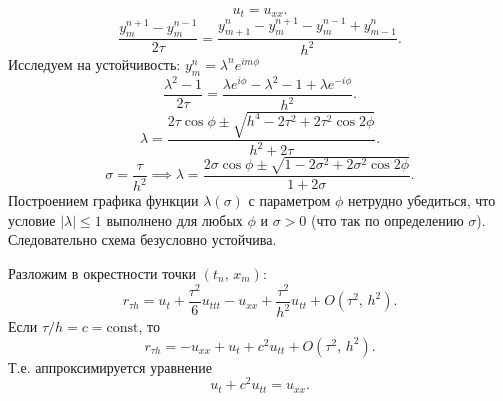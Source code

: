 \documentclass[a4paper]{article}
\begin{document}
\begin{hiProb}[9.8]
\end{hiProb}
\begin{sol}
\[
u_t=u_{x x}
.\] 
\[
	\frac{y_m^{n+1}-y_m^{n-1}}{2\tau}=
	\frac{y_{m+1}^n-y_m^{n+1}-y_m^{n-1}+y
	_{m-1}^n}{h^2}
.\] 
Исследуем на устойчивость: $y_{m}^n=\lambda^n e^{i m \phi}$
\[
\frac{\lambda^2-1}{2\tau}= \frac{\lambda e^{i\phi} -\lambda^2-
1+\lambda e^{-i\phi}}{h^2}
.\] 
\[
\lambda= \frac{2\tau \cos \phi \pm  \sqrt{ h^4 -2 \tau^2+2\tau^2
\cos 2\phi} }{h^2+2 \tau}
.\] 
\[
\sigma= \frac{\tau}{h^2}\implies
\lambda= \frac{2\sigma \cos \phi\pm \sqrt{1-2 \sigma
^2+2\sigma^2 \cos 2\phi} }{1+2\sigma}
.\] 
Построением графика функции $\lambda(\sigma)$ с
параметром $\phi$ нетрудно убедиться, что
условие $|\lambda|\le 1$ выполнено для любых $\phi$ и
$\sigma>0$ (что так по определению $\sigma$). Следовательно
схема безусловно устойчива.

Разложим в окрестности точки $\left( t_n,\,x_m \right) $:
\[
r_{\tau h}= u_t + \frac{\tau^2}{6}u_{t t t}-u_{x x}+
\frac{\tau^2}{h^2} u_{t t}+ O\left( \tau^2,\,h^2 \right) 
.\] 
Если $\tau /h=c= \mathrm{const}$, то
 \[
	 r_{\tau h}= -u_{x x}+u_t +c^2 u_{t t}+ O\left( 
	 \tau^2,\,h^2\right) 
.\] 
Т.\:е. аппроксимируется уравнение
\[
u_t+c^2 u_{tt}=u_{x x}
.\] 
\end{sol}
\begin{hiProb}[9.9]
\end{hiProb}
\end{document}
